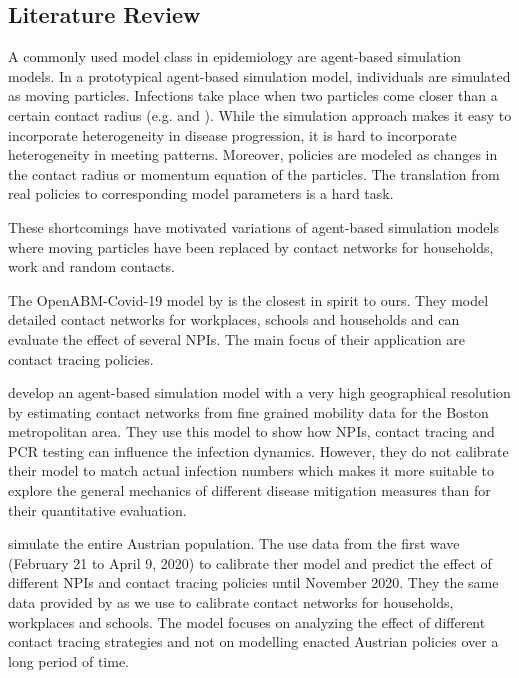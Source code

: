 \subsection{Literature Review}
\label{sec:literature_review}

A commonly used model class in epidemiology are agent-based simulation
models. In a prototypical agent-based simulation model, individuals are
simulated as moving particles. Infections take place when two particles come closer than
a certain contact radius (e.g. \citet{Silva2020} and \citet{Cuevas2020}). While the
simulation approach makes it easy to incorporate heterogeneity in disease progression, it
is hard to incorporate heterogeneity in meeting patterns. Moreover, policies are modeled
as changes in the contact radius or momentum equation of the particles. The translation
from real policies to corresponding model parameters is a hard task.

These shortcomings have motivated variations of agent-based simulation models where
moving particles have been replaced by contact networks for households, work and random
contacts.

The OpenABM-Covid-19 model by \citet{Hinch2020} is the closest in spirit to
ours. They model detailed
contact networks for workplaces, schools and households and can evaluate the effect of
several NPIs. The main focus of their application are contact tracing policies.

\citet{Aleta2020} develop an agent-based simulation model with a very high geographical
resolution by estimating contact networks from fine grained mobility data for the
Boston metropolitan area. They use this model to show how NPIs, contact tracing and PCR
testing can influence the infection dynamics. However, they do not calibrate their model
to match actual infection numbers which makes it more suitable to explore the general
mechanics of different disease mitigation measures than for their quantitative
evaluation.

\citet{Bicher2021} simulate the entire Austrian population. The use data from the first
wave (February 21 to April 9, 2020) to calibrate ther model and predict the effect of
different NPIs and contact tracing policies until November 2020. They the same data
provided by \citet{Mossong2008} as we use to calibrate contact networks for households,
workplaces and schools. The model focuses on analyzing the effect of different contact
tracing strategies and not on modelling enacted Austrian policies over a long period
of time.

